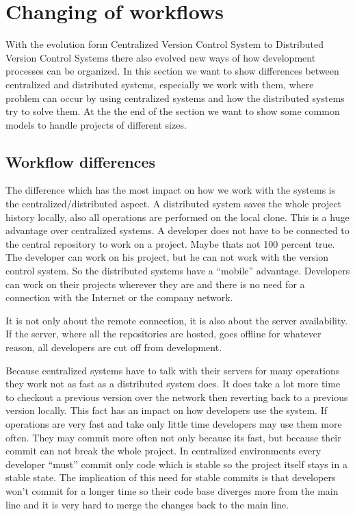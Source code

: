 \section{Changing of workflows} \label{changeofworkflows}

With the evolution form Centralized Version Control System to Distributed Version Control Systems there also 
evolved new ways of how development processes can be organized. In this section we want to show differences 
between centralized and distributed systems, especially we work with them, where problem can occur by using 
centralized systems and how the distributed systems try to solve them. At the the end of the section we want 
to show some common models to handle projects of different sizes.

\subsection{Workflow differences}

The difference which has the most impact on how we work with the systems is the centralized/distributed aspect. 
A distributed system saves the whole project history locally, also all operations are performed on the local clone. 
This is a huge advantage over centralized systems. A developer does not have to be connected to the central 
repository to work on a project. Maybe thats not 100 percent true. The developer can work on his project, but 
he can not work with the version control system. So the distributed systems have a “mobile” advantage. 
Developers can work on their projects wherever they are and there is no need for a connection with the 
Internet or the company network.

It is not only about the remote connection, it is also about the server availability. If the server, where 
all the repositories are hosted, goes offline for whatever reason, all developers are cut off from development.

Because centralized systems have to talk with their servers for many operations they work not as fast as 
a distributed system does. It does take a lot more time to checkout a previous version over the network 
then reverting back to a previous version locally. This fact has an impact on how developers use the system. 
If operations are very fast and take only little time developers may use them more often. They may commit 
more often not only because its fast, but because their commit can not break the whole project. 
In centralized environments every developer “must” commit only code which is stable so the project 
itself stays in a stable state. The implication of this need for stable commits is that developers won't 
commit for a longer time so their code base diverges more from the main line and it is very hard 
to merge the changes back to the main line.

